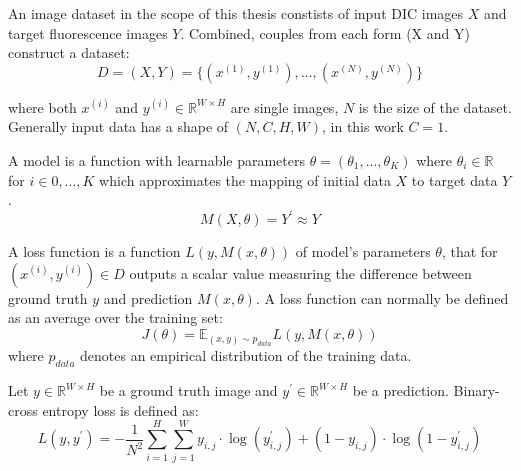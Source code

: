 \begin{definition}
	An image dataset in the scope of this thesis constists of input DIC images $X$ and target fluorescence images $Y$. Combined, couples from each form (X and Y) construct a dataset:
	\begin{equation}
		D = (X, Y) = \{(x^{(1)}, y^{(1)}), \dots, (x^{(N)}, y^{(N)})\}
	\end{equation}

	where both $x^{(i)}$ and $y^{(i)} \in \mathbb{R}^{W \times H}$ are single images, $N$ is the size of the dataset. Generally input data has a shape of $(N, C, H, W)$, in this work $C = 1$.
\end{definition}

\begin{definition}[Model]
	A model is a function with learnable parameters $\theta = (\theta_1, ..., \theta_K)$ where $\theta_i \in \mathbb{R}$ for $i \in {0, ..., K}$ which approximates the mapping of initial data $X$ to target data $Y$.
	\begin{equation}
		M(X,\theta) = Y^\prime \approx Y 
	\end{equation}
\end{definition}

\begin{definition}
	A loss function is a function $L(y, M(x, \theta))$ of model's parameters $\theta$, that for $(x^{(i)}, y^{(i)}) \in D$ outputs a scalar value measuring the difference between ground truth $y$ and prediction $M(x, \theta)$. A loss function can normally be defined as an average over the training set:
	\begin{equation}
		J(\theta) = \mathbb{E}_{(x, y)\sim p_{data}} L(y, M(x, \theta))
	\end{equation}
	where $p_{data}$ denotes an empirical distribution of the training data.
\end{definition}

\begin{definition}
	Let $y \in \mathbb{R}^{W \times H}$ be a ground truth image and $y^\prime \in \mathbb{R}^{W \times H}$ be a prediction. Binary-cross entropy loss is defined as:
	\begin{equation}
		L(y, y^\prime) = - \frac{1}{N^2}\sum_{i=1}^{H} \sum_{j=1}^{W} y_{i,j} \cdot \log(y_{i, j}^\prime) +  (1 - y_{i, j}) \cdot \log(1 - y_{i, j}^\prime) 
	\end{equation}
\end{definition}

